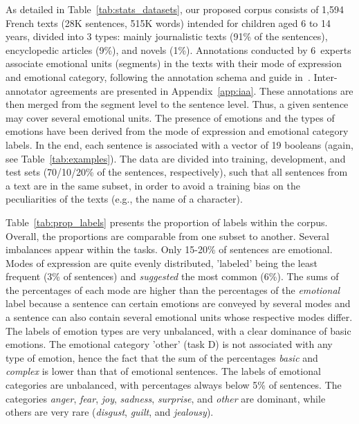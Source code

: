 As detailed in Table~\ref{tab:stats_datasets}, our proposed corpus consists of 1,594 French texts (28K sentences, 515K words) intended for children aged 6 to 14 years, divided into 3 types: mainly journalistic texts (91\% of the sentences), encyclopedic articles (9\%), and novels (1\%).
%
Annotations conducted by 6~experts associate emotional units (segments) in the texts with their mode of expression and emotional category, following the annotation schema and guide in~\citep{etienne_psycho-linguistically_2022}. Inter-annotator agreements are presented in Appendix~\ref{app:iaa}.
%
These annotations are then merged from the segment level to the sentence level. Thus, a given sentence may cover several emotional units. The presence of emotions and the types of emotions have been derived from the mode of expression and emotional category labels. In the end, each sentence is associated with a vector of 19 booleans (again, see Table~\ref{tab:examples}).
%
The data are divided into training, development, and test sets (70/10/20\% of the sentences, respectively), such that all sentences from a text are in the same subset, in order to avoid a training bias on the peculiarities of the texts (e.g., the name of a character).

Table~\ref{tab:prop_labels} presents the proportion of labels within the corpus. Overall, the proportions are comparable from one subset to another. Several imbalances appear within the tasks.
%
 Only 15-20\% of sentences are emotional.
%
 Modes of expression are quite evenly distributed, 'labeled' being the least frequent (3\% of sentences) and \textit{suggested} the most common (6\%). The sums of the percentages of each mode are higher than the percentages of the \textit{emotional} label because a sentence can certain emotions are conveyed by several modes and a sentence can also contain several emotional units whose respective modes differ.
%
 The labels of emotion types are very unbalanced, with a clear dominance of basic emotions. The emotional category 'other' (task D) is not associated with any type of emotion, hence the fact that the sum of the percentages \textit{basic} and \textit{complex} is lower than that of emotional sentences.
%
 The labels of emotional categories are unbalanced, with percentages always below 5\% of sentences. The categories \textit{anger}, \textit{fear}, \textit{joy}, \textit{sadness}, \textit{surprise}, and \textit{other} are dominant, while others are very rare (\textit{disgust}, \textit{guilt}, and \textit{jealousy}).





